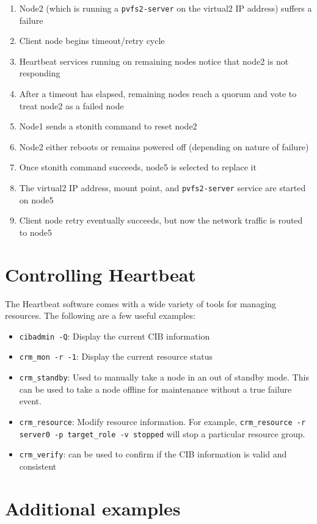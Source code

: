 \documentclass[11pt]{article}
\begin{document}
\begin{enumerate}
\item Node2 (which is running a \texttt{pvfs2-server} on the virtual2 IP
address) suffers a failure
\item Client node begins timeout/retry cycle
\item Heartbeat services running on remaining nodes notice that node2
is not responding
\item After a timeout has elapsed, remaining nodes reach a quorum and
vote to treat node2 as a failed node
\item Node1 sends a stonith command to reset node2
\item Node2 either reboots or remains powered off (depending on nature
of failure)
\item Once stonith command succeeds, node5 is selected to replace it
\item The virtual2 IP address, mount point, and
\texttt{pvfs2-server} service
are started on node5
\item Client node retry eventually succeeds, but now the network
traffic is routed to node5
\end{enumerate}

\section{Controlling Heartbeat}

The Heartbeat software comes with a wide variety of tools for managing
resources.  The following are a few useful examples:
\begin{itemize}
\item \texttt{cibadmin -Q}: Display the current CIB information
\item \texttt{crm\_mon -r -1}: Display the current resource status
\item \texttt{crm\_standby}: Used to manually take a node in an out of
standby mode.  This can be used to take a node offline for maintenance
without a true failure event.
\item \texttt{crm\_resource}: Modify resource information.  For example,
\texttt{crm\_resource -r server0 -p target\_role -v stopped} will stop a
particular resource group.
\item \texttt{crm\_verify}: can be used to confirm if the CIB
information is valid and consistent
\end{itemize}

\section{Additional examples}
\end{document}
